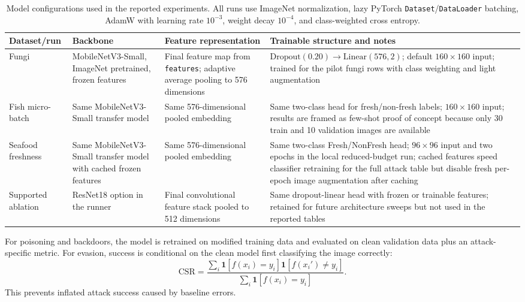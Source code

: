\documentclass[conference]{IEEEtran}
\begin{document}
\begin{table}[t]
\centering
\caption{Model configurations used in the reported experiments. All runs use ImageNet normalization, lazy PyTorch \texttt{Dataset}/\texttt{DataLoader} batching, AdamW with learning rate \(10^{-3}\), weight decay \(10^{-4}\), and class-weighted cross entropy.}
\label{tab:modelconfigs}
\small
\begin{tabular}{p{}p{}p{}p{}}
\toprule
Dataset/run & Backbone & Feature representation & Trainable structure and notes \\
\midrule
Fungi & MobileNetV3-Small, ImageNet pretrained, frozen features & Final feature map from \texttt{features}; adaptive average pooling to 576 dimensions & \(\mathrm{Dropout}(0.20)\rightarrow\mathrm{Linear}(576,2)\); default \(160\times160\) input; trained for the pilot fungi rows with class weighting and light augmentation \\
Fish micro-batch & Same MobileNetV3-Small transfer model & Same 576-dimensional pooled embedding & Same two-class head for fresh/non-fresh labels; \(160\times160\) input; results are framed as few-shot proof of concept because only 30 train and 10 validation images are available \\
Seafood freshness & Same MobileNetV3-Small transfer model with cached frozen features & Same 576-dimensional pooled embedding & Same two-class Fresh/NonFresh head; \(96\times96\) input and two epochs in the local reduced-budget run; cached features speed classifier retraining for the full attack table but disable fresh per-epoch image augmentation after caching \\
Supported ablation & ResNet18 option in the runner~\cite{resnet} & Final convolutional feature stack pooled to 512 dimensions & Same dropout-linear head with frozen or trainable features; retained for future architecture sweeps but not used in the reported tables \\
\bottomrule
\end{tabular}
\end{table}

For poisoning and backdoors, the model is retrained on modified training data and evaluated on clean validation data plus an attack-specific metric. For evasion, success is conditional on the clean model first classifying the image correctly:
\begin{equation}
\mathrm{CSR}=
\frac{\sum_i \mathbf{1}[f(x_i)=y_i]\mathbf{1}[f(x_i')\neq y_i]}
{\sum_i \mathbf{1}[f(x_i)=y_i]}.
\label{eq:csr}
\end{equation}
This prevents inflated attack success caused by baseline errors.
\end{document}
